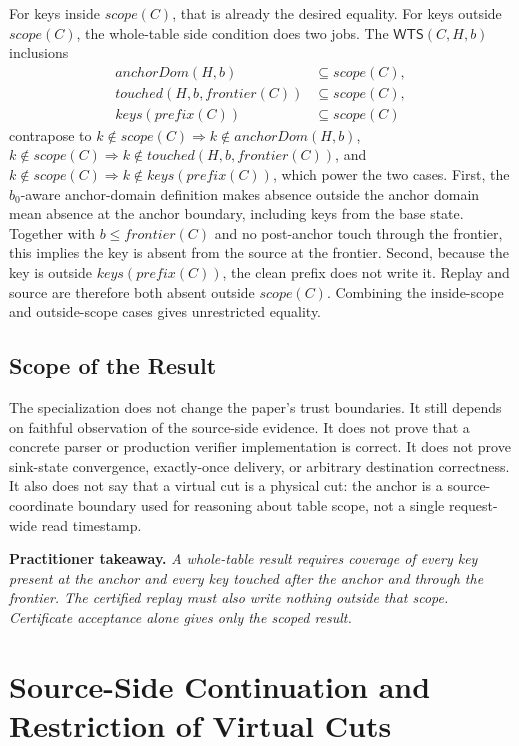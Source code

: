 \documentclass[letterpaper,10pt,twocolumn]{article}
\newcommand{\Scope}{\mathit{scope}}
\newcommand{\Frontier}{\mathit{frontier}}
\newcommand{\CleanPrefix}{\mathit{prefix}}
\newcommand{\AnchorDomain}{\mathit{anchorDom}}
\newcommand{\TouchedBetween}{\mathit{touched}}
\newcommand{\ReplayKeys}{\mathit{keys}}
\newcommand{\WTS}{\mathsf{WTS}}
\begin{document}
For keys inside $\Scope(C)$, that is already the desired equality.
For keys outside $\Scope(C)$, the whole-table side condition does
two jobs. The $\WTS(C,H,b)$ inclusions
\[
  \begin{aligned}
    \AnchorDomain(H,b)                &\subseteq \Scope(C), \\
    \TouchedBetween(H,b,\Frontier(C)) &\subseteq \Scope(C), \\
    \ReplayKeys(\CleanPrefix(C))      &\subseteq \Scope(C)
  \end{aligned}
\]
contrapose to
$k \notin \Scope(C) \Rightarrow k \notin \AnchorDomain(H,b)$,
$k \notin \Scope(C) \Rightarrow
  k \notin \TouchedBetween(H,b,\Frontier(C))$, and
$k \notin \Scope(C) \Rightarrow k \notin \ReplayKeys(\CleanPrefix(C))$,
which power the two cases. First, the $b_0$-aware anchor-domain
definition makes absence outside the anchor domain mean absence at the
anchor boundary, including keys from the base state. Together with
$b \le \Frontier(C)$ and no post-anchor touch through the frontier,
this implies the key is absent from the source at the frontier.
Second, because the key is outside $\ReplayKeys(\CleanPrefix(C))$, the
clean prefix does not write it. Replay and source are therefore both
absent outside $\Scope(C)$. Combining the inside-scope and
outside-scope cases gives unrestricted equality.

\subsection{Scope of the Result}\label{boundaries}

The specialization does not change the paper's trust boundaries. It
still depends on faithful observation of the source-side evidence. It
does not prove that a concrete parser or production verifier
implementation is correct. It does not prove sink-state convergence,
exactly-once delivery, or arbitrary destination correctness. It also
does not say that a virtual cut is a physical cut: the anchor is a
source-coordinate boundary used for reasoning about table scope, not a
single request-wide read timestamp.

\smallskip
\noindent\textbf{Practitioner takeaway.} \emph{A whole-table result
requires coverage of every key present at the anchor and every key
touched after the anchor and through the frontier. The certified replay must also write
nothing outside that scope. Certificate acceptance alone gives only the
scoped result.}

\section{Source-Side Continuation and Restriction of Virtual
Cuts}\label{source-side-continuation-and-restriction}
\end{document}
